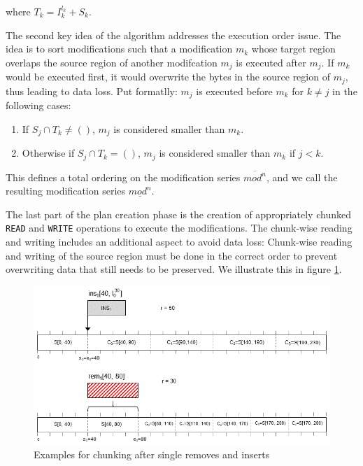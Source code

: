 \documentclass[english, 10pt, openright, twocolumn, landscape, twoside, notitlepage, a4paper, pdftex]		
{article}
\begin{document}
where $T_{k}=I_{k}^{l_{k}}+S_{k}$.

The second key idea of the algorithm addresses the execution order issue. The idea is to sort modifications such that a modification $m_{k}$ whose target region overlaps the source region of another modifcation $m_{j}$ is executed after $m_{j}$. If $m_{k}$ would be executed first, it would overwrite the bytes in the source region of $m_{j}$, thus leading to data loss. Put formatlly: $m_{j}$ is executed before $m_{k}$ for $k\neq j$ in the following cases:
\begin{enumerate}
\item If $S_{j}\cap T_{k}\neq ()$, $m_{j}$ is considered smaller than $m_{k}$.
\item Otherwise if $S_{j}\cap T_{k}=()$, $m_{j}$ is considered smaller than $m_{k}$ if $j<k$.
\end{enumerate}

This defines a total ordering on the modification series $\overline{mod^{n}}$, and we call the resulting modification series $\underline{mod^{n}}$.

The last part of the plan creation phase is the creation of appropriately chunked \texttt{READ} and \texttt{WRITE} operations to execute the modifications. The chunk-wise reading and writing includes an additional aspect to avoid data loss: Chunk-wise reading and writing of the source region must be done in the correct order to prevent overwriting data that still needs to be preserved. We illustrate this in figure \ref{fig:ChunkOrder}.

\begin{figure}[htbp]
\centering
\includegraphics[width=1.00\columnwidth]{figures/Chunks.png}
\caption{Examples for chunking after single removes and inserts}
\label{fig:ChunkOrder}
\end{figure}
\end{document}
